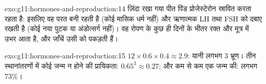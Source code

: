 \begin{solution}{exo:g11:hormones-and-reproduction:14}
ज़िंदा रखा गया पीत पिंड प्रोजेस्टेरोन स्रावित करता रहता है: इसलिए वह परत
बनी रहती है (कोई मासिक धर्म नहीं) और ऋणात्मक  LH तथा FSH को दबाए
रखती है (कोई नया पुटक या अंडोत्सर्ग नहीं)। वह  रोपण के कुछ ही दिनों
के भीतर रक्त और मूत्र में उभर आता है, और जाँचें उसी को पकड़ती हैं।
\end{solution}

\begin{solution}{exo:g11:hormones-and-reproduction:15}
$12 \times 0.6 \times 0.4 \approx 2.9$: यानी लगभग 3 भ्रूण। तीन
स्थानांतरणों में कोई जन्म न होने की प्रायिकता: $0.65^3 \approx 0.27$; और
कम से कम एक जन्म की: लगभग 73\%।
\end{solution}


